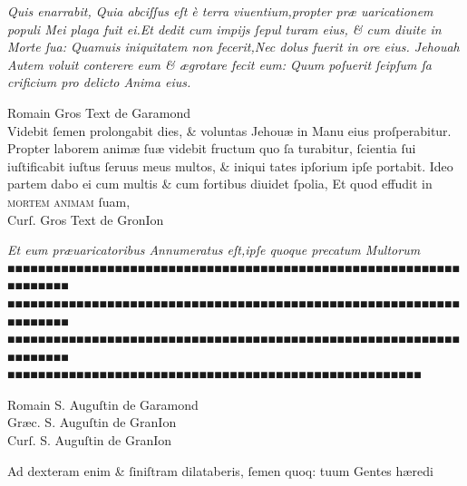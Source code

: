 \documentclass[letterpaper]{article}
\newcommand{\threecolumntypefacenames}[3]{\begin{multicols}{3}
		\tiny
		\hfill \qquad \qquad \qquad \qquad #1\hspace*{\fill}\\
		\columnbreak
		\hfill #2\hspace*{\fill}\\
		\columnbreak
		\hfill #3\qquad \qquad \qquad \qquad \hspace*{\fill}
\end{multicols}}
\begin{document}
{\begin{multicols}{2}
	\columnbreak

	\justifying
	\noindent
	\textit{Quis enarrabit, Quia abciſſus eſt \`e terra viuentium,propter pr\ae{} \linebreak
		uaricationem populi Mei plaga fuit ei.Et dedit cum impijs ſepul\linebreak
		turam eius, \& cum diuite in Morte ſua: Quamuis iniquitatem\linebreak
		non fecerit,Nec dolus fuerit in ore eius. Jehouah Autem voluit\linebreak
		conterere eum \& \ae{}grotare fecit eum: Quum poſuerit ſeipſum ſa\linebreak
		crificium pro delicto Anima eius.}
\end{multicols}
\vspace{-3\baselineskip}
\begin{multicols}{2}
	\tiny
	\centering
	Romain Gros Text de Garamond\\
	\small
	\justifying
	\noindent \qquad Videbit ſemen prolongabit dies, \& voluntas Jehou\ae{} in Manu eius\linebreak
	proſperabitur. Propter laborem anim\ae{} ſu\ae{} videbit fructum quo ſa\linebreak
	turabitur, ſcientia ſui iuſtificabit iuſtus ſeruus meus multos, \& iniqui\linebreak
	tates ipſorium ipſe portabit. Ideo partem dabo ei cum multis \& cum\linebreak
	fortibus diuidet ſpolia, Et quod effudit in \textsc{mortem animam} ſuam,\\

	\columnbreak
	\tiny
	\centering
	Curſ. Gros Text de GronIon

	\small
	\justifying
	\noindent
	\textit{Et eum pr\ae{}uaricatoribus Annumeratus eſt,ipſe quoque precatum Multorum\linebreak
		■■■■■■■■■■■■■■■■■■■■■■■■■■■■■■■■■■■■■■■■■■■■■■■■■■■■■■■■■■■■■■■■■■■\linebreak
		■■■■■■■■■■■■■■■■■■■■■■■■■■■■■■■■■■■■■■■■■■■■■■■■■■■■■■■■■■■■■■■■■■■\linebreak
		■■■■■■■■■■■■■■■■■■■■■■■■■■■■■■■■■■■■■■■■■■■■■■■■■■■■■■■■■■■■■■■■■■■\linebreak
		■■■■■■■■■■■■■■■■■■■■■■■■■■■■■■■■■■■■■■■■■■■■■■■■■■■■■■\\}
\end{multicols}
\vspace{-2.2\baselineskip}
\threecolumntypefacenames{Romain S. Auguſtin de Garamond}{Gr\ae{}c. S. Auguſtin de GranIon}{Curſ. S. Auguſtin de GranIon}
\vspace{-2.2\baselineskip}
\begin{multicols}{2}
	\fontsize{8}{9}\selectfont
	\justifying
	\noindent \quad Ad dexteram enim \& ſiniſtram dilataberis, ſemen quoq: tuum Gentes h\ae{}redi\linebreak


\end{multicols}}
\end{document}
